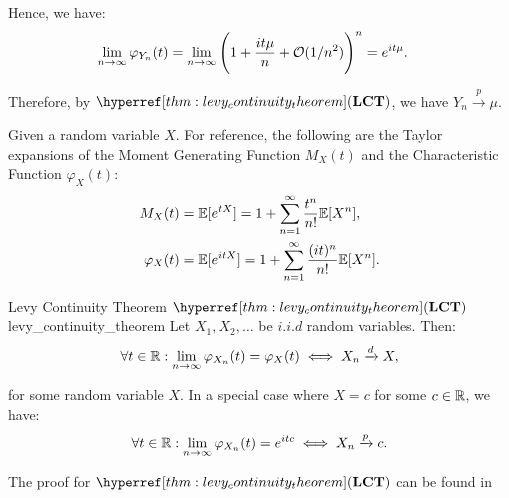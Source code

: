 \begin{proof*}
\begin{enumerate}
        \noindent Hence, we have:
        \begin{align*}
            \lim_{n\to\infty}\varphi_{Y_n}(t) &= \lim_{n\to\infty}\Bigg( 
                1 + \frac{it\mu}{n} + \mathcal{O}(1/n^2)
             \Bigg)^n = e^{it\mu}.
        \end{align*}

        \noindent Therefore, by $\LCT$, we have $Y_n\xrightarrow{p} \mu$.
    \end{enumerate}

    \begin{remark}
        Given a random variable $X$. For reference, the following are the Taylor expansions of the Moment Generating Function $M_X(t)$ and the Characteristic Function $\varphi_X(t)$:
        \begin{equation}
            \begin{aligned}
                M_X(t) &= \mathbb{E}[e^{tX}] = 1 + \sum_{n=1}^\infty \frac{t^n}{n!}\mathbb{E}[X^n], \\
                \varphi_X(t) &= \mathbb{E}[e^{itX}] = 1 + \sum_{n=1}^\infty \frac{(it)^n}{n!}\mathbb{E}[X^n].
            \end{aligned}
        \end{equation}
    \end{remark}
\end{proof*}

\begin{theorem}{Levy Continuity Theorem $\LCT$}{levy_continuity_theorem}
    Let $X_1, X_2, \dots$ be $i.i.d$ random variables. Then:
    \begin{equation}
        \forall t \in \mathbb{R}: \lim_{n\to\infty}\varphi_{X_n}(t) = \varphi_X(t) \iff X_n \xrightarrow{d} X,
    \end{equation}

    \noindent for some random variable $X$. In a special case where $X = c$ for some $c\in \mathbb{R}$, we have:
    \begin{equation}
        \forall t \in \mathbb{R} : \lim_{n\to\infty} \varphi_{X_n}(t) = e^{itc} \iff X_n \xrightarrow{p} c.
    \end{equation}
\end{theorem}

\begin{proof*}
    The proof for $\LCT$ can be found in \cite[Section 9.1, Theorem 9.1 and Collorary 9.1]{book:allen2004}
\end{proof*}

